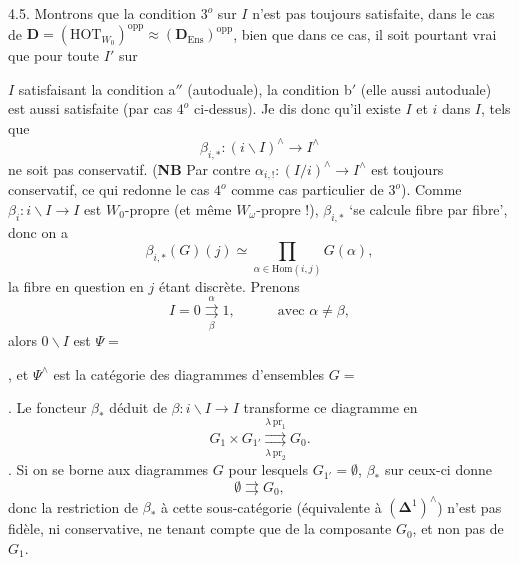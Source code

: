 \documentclass[11pt]{article}
\newcommand{\printedpage}[1]{\marginpar{\footnotesize p.~#1}}
\newcommand{\msp}[1]{\marginpar{\footnotesize [#1]}}
\newcommand{\bD}{\mathbf{D}}
\begin{document}
4.5. Montrons que la condition $3^o$ sur $I$ n'est pas toujours satisfaite, dans le cas de $\bD = (\mathrm{HOT}_{W_0})^{\mathrm{opp}} \approx (\bD_{\mathrm{Ens}})^{\mathrm{opp}}$, bien que dans ce cas, il soit pourtant vrai que pour toute $I'$ sur

\printedpage{39}

$I$ satisfaisant la condition a$''$ (autoduale), la condition b$'$ (elle aussi autoduale) est aussi satisfaite (par cas $4^o$ ci-dessus). Je dis donc qu'il existe $I$ et $i$ dans $I$, tels que
\[
\beta_{i,*} : (i\backslash I)^\wedge \longrightarrow I^\wedge
\]
ne soit pas conservatif. (\textbf{NB} Par contre $\alpha_{i,!} : (I/i)^\wedge \longrightarrow I^\wedge$ est toujours conservatif, ce qui redonne le cas $4^o$ comme cas particulier de $3^o$). Comme $\beta_i : i\backslash I \longrightarrow I$ est $W_0$-propre (et même $W_\omega$-propre !), $\beta_{i,*}$ `se calcule fibre par fibre', donc on a
\msp{page 64}
\[
\beta_{i,*}(G)(j) \simeq \prod_{\alpha\in\mathrm{Hom}(i,j)} G(\alpha),
\]
la fibre en question en $j$ étant discrète. Prenons
\[
I = 0 \underset{\beta}{\overset{\alpha}{\rightrightarrows}} 1, \qquad\quad \text{avec } \alpha \neq \beta,
\]
alors $0\backslash I$ est $\Psi = {}$, et $\Psi^\wedge$ est la catégorie des diagrammes d'ensembles $G = {}$. Le foncteur $\beta_*$ déduit de $\beta : i\backslash I \longrightarrow I$ transforme ce diagramme en
\[
G_1 \times G_{1'} \underset{\lambda\,\mathrm{pr}_2}{\overset{\lambda\,\mathrm{pr}_1}{\rightrightarrows}} G_0.
\]
. Si on se borne aux diagrammes $G$ pour lesquels $G_{1'} = \emptyset$, $\beta_*$ sur ceux-ci donne
\[
\emptyset \rightrightarrows G_0,
\]
donc la restriction de $\beta_*$ à cette sous-catégorie (équivalente à $(\boldsymbol{\Delta}^1)^\wedge$) n'est pas fidèle, ni conservative, ne tenant compte que de la composante $G_0$, et non pas de $G_1$.

\msp{page 63bis}
\end{document}
